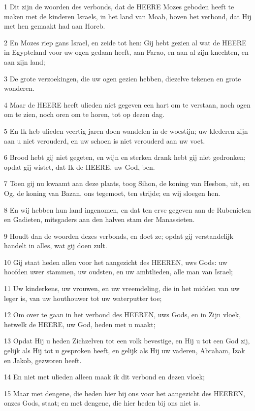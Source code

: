\par 1 Dit zijn de woorden des verbonds, dat de HEERE Mozes geboden heeft te maken met de kinderen Israels, in het land van Moab, boven het verbond, dat Hij met hen gemaakt had aan Horeb.
\par 2 En Mozes riep gans Israel, en zeide tot hen: Gij hebt gezien al wat de HEERE in Egypteland voor uw ogen gedaan heeft, aan Farao, en aan al zijn knechten, en aan zijn land;
\par 3 De grote verzoekingen, die uw ogen gezien hebben, diezelve tekenen en grote wonderen.
\par 4 Maar de HEERE heeft ulieden niet gegeven een hart om te verstaan, noch ogen om te zien, noch oren om te horen, tot op dezen dag.
\par 5 En Ik heb ulieden veertig jaren doen wandelen in de woestijn; uw klederen zijn aan u niet verouderd, en uw schoen is niet verouderd aan uw voet.
\par 6 Brood hebt gij niet gegeten, en wijn en sterken drank hebt gij niet gedronken; opdat gij wistet, dat Ik de HEERE, uw God, ben.
\par 7 Toen gij nu kwaamt aan deze plaats, toog Sihon, de koning van Hesbon, uit, en Og, de koning van Bazan, ons tegemoet, ten strijde; en wij sloegen hen.
\par 8 En wij hebben hun land ingenomen, en dat ten erve gegeven aan de Rubenieten en Gadieten, mitsgaders aan den halven stam der Manassieten.
\par 9 Houdt dan de woorden dezes verbonds, en doet ze; opdat gij verstandelijk handelt in alles, wat gij doen zult.
\par 10 Gij staat heden allen voor het aangezicht des HEEREN, uws Gods: uw hoofden uwer stammen, uw oudsten, en uw ambtlieden, alle man van Israel;
\par 11 Uw kinderkens, uw vrouwen, en uw vreemdeling, die in het midden van uw leger is, van uw houthouwer tot uw waterputter toe;
\par 12 Om over te gaan in het verbond des HEEREN, uws Gods, en in Zijn vloek, hetwelk de HEERE, uw God, heden met u maakt;
\par 13 Opdat Hij u heden Zichzelven tot een volk bevestige, en Hij u tot een God zij, gelijk als Hij tot u gesproken heeft, en gelijk als Hij uw vaderen, Abraham, Izak en Jakob, gezworen heeft.
\par 14 En niet met ulieden alleen maak ik dit verbond en dezen vloek;
\par 15 Maar met dengene, die heden hier bij ons voor het aangezicht des HEEREN, onzes Gods, staat; en met dengene, die hier heden bij ons niet is.

